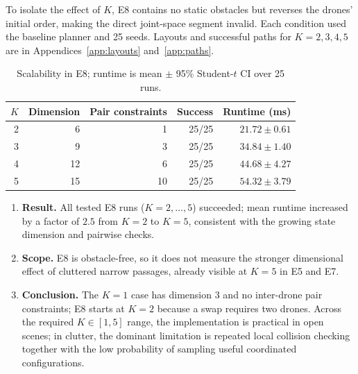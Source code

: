 \documentclass[11pt,a4paper]{article}
\begin{document}
To isolate the effect of $K$, E8 contains no static obstacles but reverses the
drones' initial order, making the direct joint-space segment invalid. Each
condition used the baseline planner and 25 seeds. Layouts and successful
paths for $K=2,3,4,5$ are in Appendices~\ref{app:layouts}
and~\ref{app:paths}.

\begin{table}[H]
  \centering
  \caption{Scalability in E8; runtime is mean $\pm$ 95\% Student-$t$ CI
  over 25 runs.}
  \label{tab:scalability-results}
  \begin{tabular}{@{}rrrrr@{}}
    \toprule
    $K$ & Dimension & Pair constraints & Success & Runtime (ms) \\
    \midrule
    2 & 6  & 1  & 25/25 & $21.72 \pm 0.61$ \\
    3 & 9  & 3  & 25/25 & $34.84 \pm 1.40$ \\
    4 & 12 & 6  & 25/25 & $44.68 \pm 4.27$ \\
    5 & 15 & 10 & 25/25 & $54.32 \pm 3.79$ \\
    \bottomrule
  \end{tabular}
\end{table}

\begin{enumerate}[label=(\arabic*),nosep]
  \item \textbf{Result.} All tested E8 runs ($K=2,\ldots,5$) succeeded;
        mean runtime
        increased by a factor of $2.5$ from $K=2$ to $K=5$, consistent
        with the growing state dimension and pairwise checks.
  \item \textbf{Scope.} E8 is obstacle-free, so it does not measure the
        stronger dimensional effect of cluttered narrow passages, already
        visible at $K=5$ in E5 and E7.
  \item \textbf{Conclusion.} The $K=1$ case has dimension $3$ and no
        inter-drone pair constraints; E8 starts at $K=2$ because a swap
        requires two drones. Across the required $K\in[1,5]$ range, the
        implementation is practical in open scenes; in clutter, the
        dominant limitation is repeated local collision checking together
        with the low probability of sampling useful coordinated
        configurations.
\end{enumerate}
\end{document}
